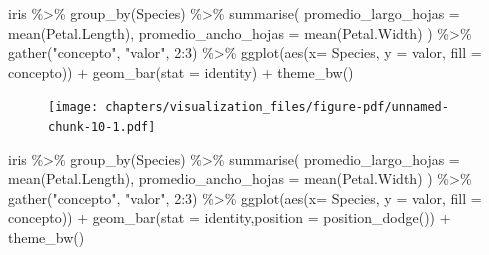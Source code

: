 \documentclass[
  letterpaper,
  DIV=11,
  numbers=noendperiod]{scrreprt}
\newenvironment{Shaded}{\begin{snugshade}}{\end{snugshade}}
\newcommand{\AttributeTok}[1]{\textcolor[rgb]{0.40,0.45,0.13}{#1}}
\newcommand{\DecValTok}[1]{\textcolor[rgb]{0.68,0.00,0.00}{#1}}
\newcommand{\FunctionTok}[1]{\textcolor[rgb]{0.28,0.35,0.67}{#1}}
\newcommand{\NormalTok}[1]{\textcolor[rgb]{0.00,0.23,0.31}{#1}}
\newcommand{\SpecialCharTok}[1]{\textcolor[rgb]{0.37,0.37,0.37}{#1}}
\newcommand{\StringTok}[1]{\textcolor[rgb]{0.13,0.47,0.30}{#1}}
\begin{document}
\begin{Shaded}
\begin{Highlighting}[]
\NormalTok{iris }\SpecialCharTok{\%\textgreater{}\%} 
  \FunctionTok{group\_by}\NormalTok{(Species) }\SpecialCharTok{\%\textgreater{}\%} 
  \FunctionTok{summarise}\NormalTok{(}
    \AttributeTok{promedio\_largo\_hojas =} \FunctionTok{mean}\NormalTok{(Petal.Length),}
    \AttributeTok{promedio\_ancho\_hojas =} \FunctionTok{mean}\NormalTok{(Petal.Width)}
\NormalTok{  ) }\SpecialCharTok{\%\textgreater{}\%} 
  \FunctionTok{gather}\NormalTok{(}\StringTok{"concepto"}\NormalTok{, }\StringTok{"valor"}\NormalTok{, }\DecValTok{2}\SpecialCharTok{:}\DecValTok{3}\NormalTok{) }\SpecialCharTok{\%\textgreater{}\%} 
  \FunctionTok{ggplot}\NormalTok{(}\FunctionTok{aes}\NormalTok{(}\AttributeTok{x=}\NormalTok{ Species, }\AttributeTok{y =}\NormalTok{ valor, }\AttributeTok{fill =}\NormalTok{ concepto)) }\SpecialCharTok{+}
  \FunctionTok{geom\_bar}\NormalTok{(}\AttributeTok{stat =} \StringTok{\textquotesingle{}identity\textquotesingle{}}\NormalTok{) }\SpecialCharTok{+}
  \FunctionTok{theme\_bw}\NormalTok{()}
\end{Highlighting}
\end{Shaded}

\begin{figure}[H]

{\centering \texttt{[image: chapters/visualization\_files/figure-pdf/unnamed-chunk-10-1.pdf]}

}

\end{figure}

\begin{Shaded}
\begin{Highlighting}[]
\NormalTok{iris }\SpecialCharTok{\%\textgreater{}\%} 
  \FunctionTok{group\_by}\NormalTok{(Species) }\SpecialCharTok{\%\textgreater{}\%} 
  \FunctionTok{summarise}\NormalTok{(}
    \AttributeTok{promedio\_largo\_hojas =} \FunctionTok{mean}\NormalTok{(Petal.Length),}
    \AttributeTok{promedio\_ancho\_hojas =} \FunctionTok{mean}\NormalTok{(Petal.Width)}
\NormalTok{  ) }\SpecialCharTok{\%\textgreater{}\%} 
  \FunctionTok{gather}\NormalTok{(}\StringTok{"concepto"}\NormalTok{, }\StringTok{"valor"}\NormalTok{, }\DecValTok{2}\SpecialCharTok{:}\DecValTok{3}\NormalTok{) }\SpecialCharTok{\%\textgreater{}\%} 
  \FunctionTok{ggplot}\NormalTok{(}\FunctionTok{aes}\NormalTok{(}\AttributeTok{x=}\NormalTok{ Species, }\AttributeTok{y =}\NormalTok{ valor, }\AttributeTok{fill =}\NormalTok{ concepto)) }\SpecialCharTok{+}
  \FunctionTok{geom\_bar}\NormalTok{(}\AttributeTok{stat =} \StringTok{\textquotesingle{}identity\textquotesingle{}}\NormalTok{,}\AttributeTok{position =} \FunctionTok{position\_dodge}\NormalTok{()) }\SpecialCharTok{+}
  \FunctionTok{theme\_bw}\NormalTok{()}
\end{Highlighting}
\end{Shaded}
\end{document}
